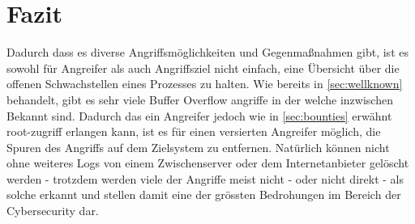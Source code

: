\pagebreak

\section{Fazit}
Dadurch dass es diverse Angriffsmöglichkeiten und Gegenmaßnahmen gibt,
ist es sowohl für Angreifer als auch Angriffsziel nicht einfach,
eine Übersicht über die offenen Schwachstellen eines Prozesses zu halten.
Wie bereits in \autoref{sec:wellknown} behandelt, gibt es sehr viele Buffer Overflow
angriffe in der welche inzwischen Bekannt sind. Dadurch das ein Angreifer jedoch
wie in \autoref{sec:bounties} erwähnt root-zugriff erlangen kann, ist es für einen
versierten Angreifer möglich, die Spuren des Angriffs auf dem Zielsystem zu
entfernen. Natürlich können nicht ohne weiteres Logs von einem Zwischenserver
oder dem Internetanbieter gelöscht werden - trotzdem werden viele der Angriffe
meist nicht - oder nicht direkt - als solche erkannt und stellen damit eine der
grössten Bedrohungen im Bereich der Cybersecurity dar.




















